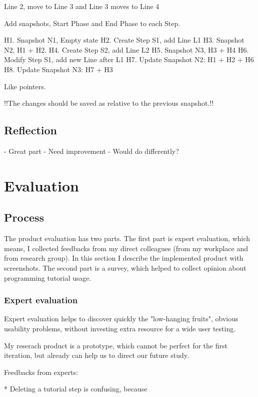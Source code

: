 \documentclass[12pt, a4paper, oneside, openright, medskipamount]{report}
\begin{document}
Line 2, move to Line 3 and Line 3 moves to Line 4

Add snapshots, Start Phase and End Phase to each Step.

H1. Snapshot N1, Empty state
H2. Create Step S1, add Line L1
H3. Snapshot N2, H1 + H2.
H4. Create Step S2, add Line L2
H5. Snapshot N3, H3 + H4
H6. Modify Step S1, add new Line after L1
H7. Update Snapshot N2: H1 + H2 + H6
H8. Update Snapshot N3: H7 + H3

Like pointers.

!!The changes should be saved as relative to the previous snapshot.!!



\section{Reflection}

- Great part
- Need improvement
- Would do differently?

\chapter{Evaluation}

\section{Process}

The product evaluation has two parts. The first part is expert evaluation, which means, I collected feedbacks from my direct colleagues (from my workplace and from research group). In this section I describe the implemented product with screenshots. The second part is a survey, which helped to collect opinion about programming tutorial usage.

\subsection{Expert evaluation}

Expert evaluation helps to discover quickly the "low-hanging fruits", obvious usability problems, without investing extra resource for a wide user testing.

My reserach product is a prototype, which cannot be perfect for the first iteration, but already can help us to direct our future study.

Feedbacks from experts:

* Deleting a tutorial step is confusing, because
\end{document}
